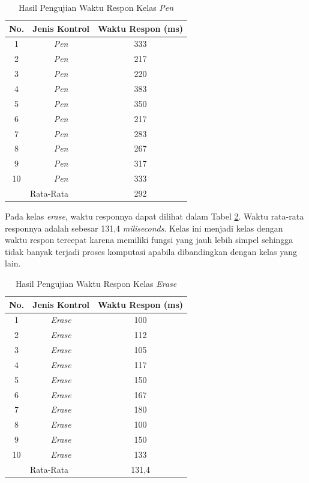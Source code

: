 \begin{longtable}{|c|c|c|}
  \caption{Hasil Pengujian Waktu Respon Kelas \emph{Pen}}
  \label{tb:Hasil Pengujian Waktu Respon Kelas Pen Slide}\\
  \hline
  \rowcolor[HTML]{FFFFFF}
  \textbf{No.} & \textbf{Jenis Kontrol} & \textbf{Waktu Respon (ms)} \\
  \hline
  1 & \emph{Pen} & 333 \\
  2 & \emph{Pen} & 217 \\
  3 & \emph{Pen} & 220 \\
  4 & \emph{Pen} & 383 \\
  5 & \emph{Pen} & 350 \\
  6 & \emph{Pen} & 217 \\
  7 & \emph{Pen} & 283 \\
  8 & \emph{Pen} & 267 \\
  9 & \emph{Pen} & 317 \\
  10 & \emph{Pen} & 333 \\
  \hline
  \multicolumn{2}{|c|}{Rata-Rata} & 292 \\
  \hline
\end{longtable}

Pada kelas \emph{erase}, waktu responnya dapat dilihat dalam Tabel \ref{tb:Hasil Pengujian Waktu Respon Kelas Erase Slide}. Waktu rata-rata responnya adalah sebesar 131,4 \emph{miliseconds}. Kelas ini menjadi kelas dengan waktu respon tercepat karena memiliki fungsi yang jauh lebih simpel sehingga tidak banyak terjadi proses komputasi apabila dibandingkan dengan kelas yang lain.

\begin{longtable}{|c|c|c|}
  \caption{Hasil Pengujian Waktu Respon Kelas \emph{Erase}}
  \label{tb:Hasil Pengujian Waktu Respon Kelas Erase Slide}\\
  \hline
  \rowcolor[HTML]{FFFFFF}
  \textbf{No.} & \textbf{Jenis Kontrol} & \textbf{Waktu Respon (ms)} \\
  \endhead
  \hline
  1 & \emph{Erase} & 100 \\
  2 & \emph{Erase} & 112 \\
  3 & \emph{Erase} & 105 \\
  4 & \emph{Erase} & 117 \\
  5 & \emph{Erase} & 150 \\
  6 & \emph{Erase} & 167 \\
  7 & \emph{Erase} & 180 \\
  8 & \emph{Erase} & 100 \\
  9 & \emph{Erase} & 150 \\
  \hline
  10 & \emph{Erase} & 133 \\
  \hline
  \multicolumn{2}{|c|}{Rata-Rata} & 131,4 \\
  \hline
\end{longtable}

